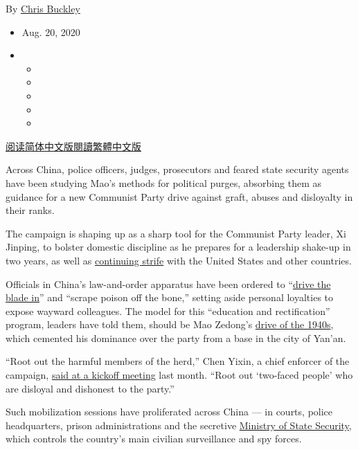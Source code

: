 By \href{https://www.nytimes3xbfgragh.onion/by/chris-buckley}{Chris
Buckley}

\begin{itemize}
\item
  Aug. 20, 2020
\item
  \begin{itemize}
  \item
  \item
  \item
  \item
  \item
  \end{itemize}
\end{itemize}

\href{https://cn.nytimes3xbfgragh.onion/china/20200821/china-xi-jinping-communist-party/}{阅读简体中文版}\href{https://cn.nytimes3xbfgragh.onion/china/20200821/china-xi-jinping-communist-party/zh-hant/}{閱讀繁體中文版}

Across China, police officers, judges, prosecutors and feared state
security agents have been studying Mao's methods for political purges,
absorbing them as guidance for a new Communist Party drive against
graft, abuses and disloyalty in their ranks.

The campaign is shaping up as a sharp tool for the Communist Party
leader, Xi Jinping, to bolster domestic discipline as he prepares for a
leadership shake-up in two years, as well as
\href{https://www.nytimes3xbfgragh.onion/2020/07/14/world/asia/cold-war-china-us.html}{continuing
strife} with the United States and other countries.

Officials in China's law-and-order apparatus have been ordered to
``\href{http://www.chinalaw.gov.cn/news/content/2020-07/30/zfyw_3253482.html}{drive
the blade in}'' and ``scrape poison off the bone,'' setting aside
personal loyalties to expose wayward colleagues. The model for this
``education and rectification'' program, leaders have told them, should
be Mao Zedong's
\href{https://www.ide.go.jp/library/English/Publish/Periodicals/De/pdf/71_01_06.pdf}{drive
of the 1940s}, which cemented his dominance over the party from a base
in the city of Yan'an.

``Root out the harmful members of the herd,'' Chen Yixin, a chief
enforcer of the campaign,
\href{http://news.ifeng.com/c/7xwhnCdD5zm}{said at a kickoff meeting}
last month. ``Root out `two-faced people' who are disloyal and dishonest
to the party.''

Such mobilization sessions have proliferated across China --- in courts,
police headquarters, prison administrations and the secretive
\href{http://www.legaldaily.com.cn/index_article/content/2020-07/19/content_8251365.htm}{Ministry
of State Security,} which controls the country's main civilian
surveillance and spy forces.

